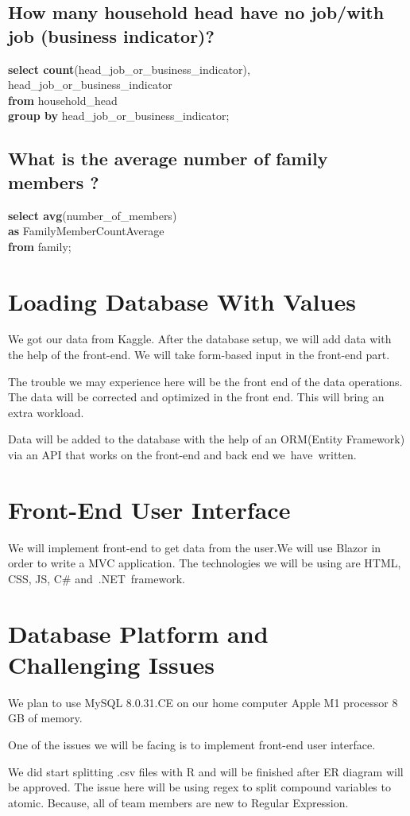 \documentclass[12 pt]{article}
\begin{document}
\begin{large}
\begin{large}
\subsection{How many household head have no job/with job (business indicator)?}
\noindent\textbf{select count}(head\_job\_or\_business\_indicator), head\_job\_or\_business\_indicator\\
\textbf{from} household\_head\\
\textbf{group by} head\_job\_or\_business\_indicator; \\

\subsection{What is the average number of family members ?}\bigbreak
\noindent\textbf{select avg}(number\_of\_members)\\ 
\noindent\textbf{as } FamilyMemberCountAverage\\ \textbf{from} family;

\bigbreak\bigbreak\bigbreak
\section{Loading Database With Values}
\bigbreak 
We got our data from Kaggle. After the database setup, we will add data with the help of the front-end. We will take form-based input in the front-end part.

The trouble we may experience here will be the front end of the data operations. The data will be corrected and optimized in the front end. This will bring an extra workload.

Data will be added to the database with the help of an ORM(Entity Framework) via an API that works on the front-end and back end we have written.

\newpage
\section{Front-End User Interface}
\bigbreak
We will implement front-end to get data from the user.We will use Blazor in order to write a MVC application. The technologies we will be using are HTML, CSS, JS, C\# and .NET framework.

\bigbreak\bigbreak\bigbreak
\section{Database Platform and Challenging Issues}
\bigbreak 
We plan to use MySQL 8.0.31.CE on our home computer Apple M1 processor 8 GB of memory.

One of the issues we will be facing is to implement front-end user interface. 

We did start splitting .csv files with R and will be finished after ER diagram will be approved. The issue here will be using regex to split compound variables to atomic. Because, all of team members are new to Regular Expression.

\end{large}
\end{large}
\end{document}
